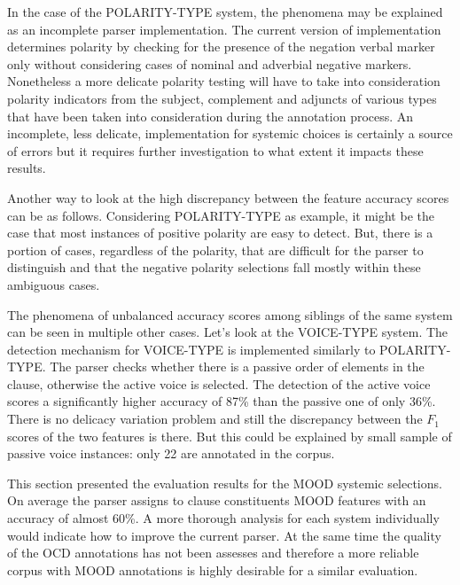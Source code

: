    In the case of the POLARITY-TYPE system, the phenomena may be explained as an incomplete parser implementation. The current version of implementation determines polarity by checking for the presence of the negation verbal marker only without considering cases of nominal and adverbial negative markers. Nonetheless a more delicate polarity testing will have to take into consideration polarity indicators from the subject, complement and adjuncts of various types that have been taken into consideration during the annotation process. An incomplete, less delicate, implementation for systemic choices is certainly a source of errors but it requires further investigation to what extent it impacts these results. %
    
    Another way to look at the high discrepancy between the feature accuracy scores can be as follows. Considering POLARITY-TYPE as example, it might be the case that most instances of positive polarity are easy to detect. But, there is a portion of cases, regardless of the polarity, that are difficult for the parser to distinguish and that the negative polarity selections fall mostly within these ambiguous cases. %
    
    The phenomena of unbalanced accuracy scores among siblings of the same system can be seen in multiple other cases. Let's look at the VOICE-TYPE system. The detection mechanism for VOICE-TYPE is implemented similarly to POLARITY-TYPE. The parser checks whether there is a passive order of elements in the clause, otherwise the active voice is selected.
    The detection of the active voice scores a significantly higher accuracy of 87\% than the passive one of only 36\%. There is no delicacy variation problem and still the discrepancy between the $F_1$ scores of the two features is there. But this could be explained by small sample of passive voice instances: only 22 are annotated in the corpus. 

    This section presented the evaluation results for the MOOD systemic selections. On average the parser assigns to clause constituents MOOD features with an accuracy of almost 60\%. A more thorough analysis for each system individually would indicate how to improve the current parser. At the same time the quality of the OCD annotations has not been assesses and therefore a more reliable corpus with MOOD annotations is highly desirable for a similar evaluation. %

